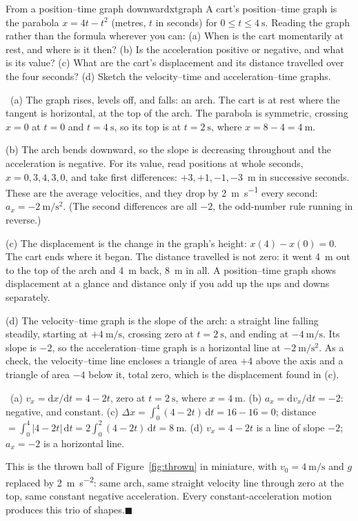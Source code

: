 \documentclass[11pt,twoside,openany]{book}
\newcommand{\dd}{\mathrm{d}}
\newcounter{check}[chapter]
\newcommand{\viewtag}[3]{\fcolorbox{#2}{#3}{\footnotesize\textbf{\textcolor{#2}{#1}}}}
\newcommand{\elemtag}{\viewtag{Elementary}{elemcol}{elempale}}
\newcommand{\calctag}{\viewtag{Calculus}{calccol}{calcpale}}
\newcommand{\elem}{\par\medskip\noindent\elemtag\ }
\newcommand{\calc}{\par\medskip\noindent\calctag\ }
\newcommand{\qed}{\hfill$\blacksquare$}
\begin{document}
\begin{example}{From a position--time graph downward}{xtgraph}
A cart's position--time graph is the parabola $x = 4t - t^2$ (metres, $t$ in seconds) for $0 \le t \le \SI{4}{\second}$. Reading the graph rather than the formula wherever you can: (a) When is the cart momentarily at rest, and where is it then? (b) Is the acceleration positive or negative, and what is its value? (c) What are the cart's displacement and its distance travelled over the four seconds? (d) Sketch the velocity--time and acceleration--time graphs.

\elem (a) The graph rises, levels off, and falls: an arch. The cart is at rest where the tangent is horizontal, at the top of the arch. The parabola is symmetric, crossing $x = 0$ at $t = 0$ and $t = \SI{4}{\second}$, so its top is at $t = \SI{2}{\second}$, where $x = 8 - 4 = \SI{4}{\metre}$.

(b) The arch bends downward, so the slope is decreasing throughout and the acceleration is negative. For its value, read positions at whole seconds, $x = 0, 3, 4, 3, 0$, and take first differences: $+3, +1, -1, -3$~m in successive seconds. These are the average velocities, and they drop by \SI{2}{\metre\per\second} every second: $a_x = \SI{-2}{\metre\per\second\squared}$. (The second differences are all $-2$, the odd-number rule running in reverse.)

(c) The displacement is the change in the graph's height: $x(4) - x(0) = 0$. The cart ends where it began. The distance travelled is not zero: it went \SI{4}{\metre} out to the top of the arch and \SI{4}{\metre} back, \SI{8}{\metre} in all. A position--time graph shows displacement at a glance and distance only if you add up the ups and downs separately.

(d) The velocity--time graph is the slope of the arch: a straight line falling steadily, starting at $+\SI{4}{\metre\per\second}$, crossing zero at $t = \SI{2}{\second}$, and ending at $\SI{-4}{\metre\per\second}$. Its slope is $-2$, so the acceleration--time graph is a horizontal line at $\SI{-2}{\metre\per\second\squared}$. As a check, the velocity--time line encloses a triangle of area $+4$ above the axis and a triangle of area $-4$ below it, total zero, which is the displacement found in (c).

\calc (a) $v_x = \dd x/\dd t = 4 - 2t$, zero at $t = \SI{2}{\second}$, where $x = \SI{4}{\metre}$. (b) $a_x = \dd v_x/\dd t = -2$: negative, and constant. (c) $\Delta x = \int_0^4 (4 - 2t)\,\dd t = 16 - 16 = 0$; distance $= \int_0^4 |4 - 2t|\,\dd t = 2\int_0^2 (4 - 2t)\,\dd t = \SI{8}{\metre}$. (d) $v_x = 4 - 2t$ is a line of slope $-2$; $a_x = -2$ is a horizontal line.

This is the thrown ball of Figure~\ref{fig:thrown} in miniature, with $v_0 = \SI{4}{\metre\per\second}$ and $g$ replaced by \SI{2}{\metre\per\second\squared}: same arch, same straight velocity line through zero at the top, same constant negative acceleration. Every constant-acceleration motion produces this trio of shapes.\qed
\end{example}
\end{document}
